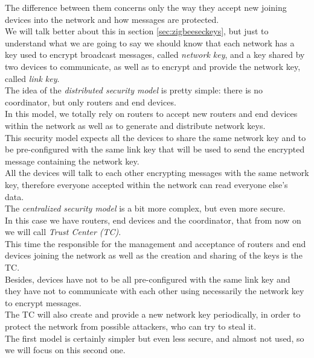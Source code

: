 \documentclass[12pt]{report}
\begin{document}
{{The difference between them concerns only the way they accept new joining devices into the network and how messages are protected.\\

We will talk better about this in section \ref{sec:zigbeeseckeys}, but just to understand what we are going to say we should know that each network has a key used to encrypt broadcast messages, called \emph{network key}, and a key shared by two devices to communicate, as well as to encrypt and provide the network key, called \emph{link key}.\\

The idea of the \emph{distributed security model} is pretty simple: there is no coordinator, but only routers and end devices.\\
In this model, we totally rely on routers to accept new routers and end devices within the network as well as to generate and distribute network keys.\\

This security model expects all the devices to share the same network key and to be pre-configured with the same link key that will be used to send the encrypted message containing the network key.\\
All the devices will talk to each other encrypting messages with the same network key, therefore everyone accepted within the network can read everyone else's data.\\

The \emph{centralized security model} is a bit more complex, but even more secure.\\
In this case we have routers, end devices and the coordinator, that from now on we will call \emph{Trust Center (TC)}.\\
This time the responsible for the management and acceptance of routers and end devices joining the network as well as the creation and sharing of the keys is the TC.\\
Besides, devices have not to be all pre-configured with the same link key and they have not to communicate with each other using necessarily the network key to encrypt messages.\\
The TC will also create and provide a new network key periodically, in order to protect the network from possible attackers, who can try to steal it.\\

The first model is certainly simpler but even less secure, and almost not used, so we will focus on this second one}.\\

}
\end{document}
